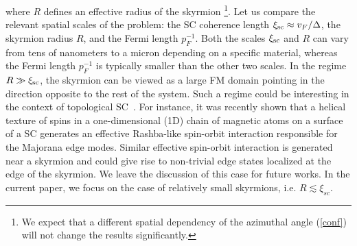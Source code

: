 \documentclass[twocolumn,showpacs,floatfix,longbibliography]{revtex4-1}
\begin{document}
where $R$ defines an effective radius of the skyrmion \footnote{We expect that a different spatial dependency of the azimuthal angle (\ref{conf}) will not change the results significantly.}. Let us compare the relevant spatial scales of the problem: the SC coherence length $\xi_{\rm sc} \approx v_F/\Delta$, the skyrmion radius $R$, and the Fermi length $p_F^{-1}$. Both the scales $\xi_{\rm sc}$ and $R$ can vary from tens of nanometers to a micron depending on a specific material, whereas the Fermi length $p_F^{-1}$ is typically smaller than the other two scales. In the regime $R\gg \xi_{\rm sc}$, the skyrmion can be viewed as a large FM domain pointing in the direction opposite to the rest of the system. Such a regime could be interesting in the context of topological SC~\cite{Alicea2012}. For instance, it was recently shown \cite{Klinovaja2013} that a helical texture of spins in a one-dimensional (1D) chain of magnetic atoms on a surface of a SC generates an effective Rashba-like spin-orbit interaction responsible for the Majorana edge modes. Similar effective spin-orbit interaction is generated near a skyrmion and could give rise to non-trivial edge states localized at the edge of the skyrmion. We leave the discussion of this  case for future works. In the current paper, we focus on the case of relatively small skyrmions, i.e. $R\lesssim \xi_{sc}$.
\end{document}
